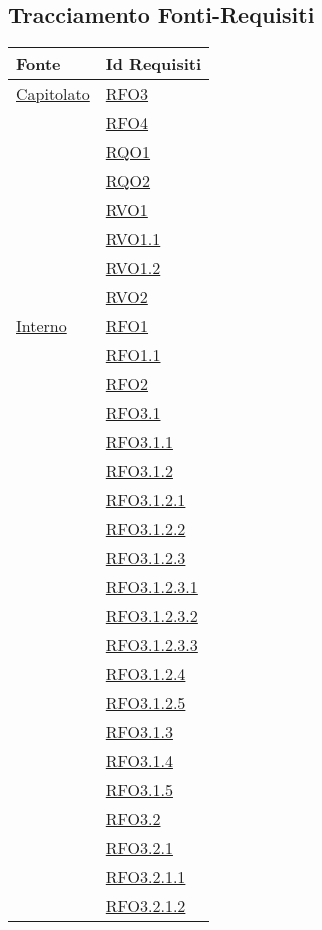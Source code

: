 \subsection{Tracciamento Fonti-Requisiti}
\normalsize
\begin{longtable}{|>{\centering}m{5cm}|m{5cm}<{\centering}|}
\hline
\textbf{Fonte} & \textbf{Id Requisiti}\\
\hline
\endhead
\hyperlink{Capitolato}{Capitolato} & \hyperlink{RFO3}{RFO3}\\
& \hyperlink{RFO4}{RFO4}\\
& \hyperlink{RQO1}{RQO1}\\
& \hyperlink{RQO2}{RQO2}\\
& \hyperlink{RVO1}{RVO1}\\
& \hyperlink{RVO1.1}{RVO1.1}\\
& \hyperlink{RVO1.2}{RVO1.2}\\
& \hyperlink{RVO2}{RVO2}\\ \hline
\hyperlink{Interno}{Interno} & \hyperlink{RFO1}{RFO1}\\
& \hyperlink{RFO1.1}{RFO1.1}\\
& \hyperlink{RFO2}{RFO2}\\
& \hyperlink{RFO3.1}{RFO3.1}\\
& \hyperlink{RFO3.1.1}{RFO3.1.1}\\
& \hyperlink{RFO3.1.2}{RFO3.1.2}\\
& \hyperlink{RFO3.1.2.1}{RFO3.1.2.1}\\
& \hyperlink{RFO3.1.2.2}{RFO3.1.2.2}\\
& \hyperlink{RFO3.1.2.3}{RFO3.1.2.3}\\
& \hyperlink{RFO3.1.2.3.1}{RFO3.1.2.3.1}\\
& \hyperlink{RFO3.1.2.3.2}{RFO3.1.2.3.2}\\
& \hyperlink{RFO3.1.2.3.3}{RFO3.1.2.3.3}\\
& \hyperlink{RFO3.1.2.4}{RFO3.1.2.4}\\
& \hyperlink{RFO3.1.2.5}{RFO3.1.2.5}\\
& \hyperlink{RFO3.1.3}{RFO3.1.3}\\
& \hyperlink{RFO3.1.4}{RFO3.1.4}\\
& \hyperlink{RFO3.1.5}{RFO3.1.5}\\
& \hyperlink{RFO3.2}{RFO3.2}\\
& \hyperlink{RFO3.2.1}{RFO3.2.1}\\
& \hyperlink{RFO3.2.1.1}{RFO3.2.1.1}\\
& \hyperlink{RFO3.2.1.2}{RFO3.2.1.2}\\

\end{longtable}
